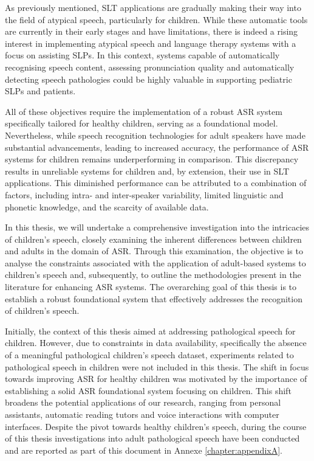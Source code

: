 As previously mentioned, \ac{SLT} applications are gradually making their way into the field of atypical speech, particularly for children. While these automatic tools are currently in their early stages and have limitations, there is indeed a rising interest in implementing atypical speech and language therapy systems with a focus on assisting \acp{SLP}. In this context, systems capable of automatically recognising speech content, assessing pronunciation quality and automatically detecting speech pathologies could be highly valuable in supporting pediatric \acp{SLP} and patients.

All of these objectives require the implementation of a robust \ac{ASR} system specifically tailored for healthy children, serving as a foundational model. Nevertheless, while speech recognition technologies for adult speakers have made substantial advancements, leading to increased accuracy, the performance of \ac{ASR} systems for children remains underperforming in comparison. This discrepancy results in unreliable systems for children and, by extension, their use in \ac{SLT} applications. This diminished performance can be attributed to a combination of factors, including intra- and inter-speaker variability, limited linguistic and phonetic knowledge, and the scarcity of available data.

In this thesis, we will undertake a comprehensive investigation into the intricacies of children's speech, closely examining the inherent differences between children and adults in the domain of \ac{ASR}. Through this examination, the objective is to analyse the constraints associated with the application of adult-based systems to children's speech and, subsequently, to outline the methodologies present in the literature for enhancing \ac{ASR} systems. The overarching goal of this thesis is to establish a robust foundational system that effectively addresses the recognition of children's speech.

Initially, the context of this thesis aimed at addressing pathological speech for children. However, due to constraints in data availability, specifically the absence of a meaningful pathological children's speech dataset, experiments related to pathological speech in children were not included in this thesis. 
The shift in focus towards improving \ac{ASR} for healthy children was motivated by the importance of establishing a solid \ac{ASR} foundational system focusing on children. This shift broadens the potential applications of our research, ranging from personal assistants, automatic reading tutors and voice interactions with computer interfaces. Despite the pivot towards healthy children's speech, during the course of this thesis investigations into adult pathological speech have been conducted and are reported as part of this document in Annexe \ref{chapter:appendixA}.


